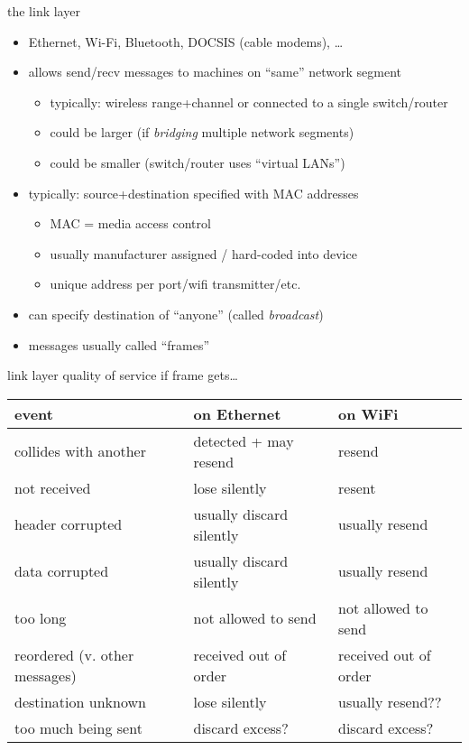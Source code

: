 \begin{frame}{the link layer}
\begin{itemize}
\item Ethernet, Wi-Fi, Bluetooth, DOCSIS (cable modems), \ldots
\vspace{.5cm}
\item allows send/recv messages to machines on ``same'' network segment
    \begin{itemize}
    \item typically: wireless range+channel or connected to a single switch/router
    \item could be larger (if \textit{bridging} multiple network segments)
    \item could be smaller (switch/router uses ``virtual LANs'')
    \end{itemize}
\item typically: source+destination specified with MAC addresses
    \begin{itemize}
    \item MAC = media access control
    \item usually manufacturer assigned / hard-coded into device
    \item unique address per port/wifi transmitter/etc.
    \end{itemize}
\item can specify destination of ``anyone'' (called \textit{broadcast})
\item messages usually called ``frames''
\end{itemize}
\end{frame}

\begin{frame}{link layer quality of service}
if frame gets\ldots \\
\small
\begin{tabular}{l|l|l}
event & on Ethernet & on WiFi \\\hline
collides with another & detected + may resend & resend\\
not received & lose silently & resent \\
header corrupted & usually discard silently & usually resend \\
data corrupted & usually discard silently & usually resend \\
too long & not allowed to send & not allowed to send \\
reordered (v. other messages)  & received out of order & received out of order \\
destination unknown & lose silently & usually resend?? \\
too much being sent & discard excess? & discard excess? \\
\end{tabular}
\end{frame}
